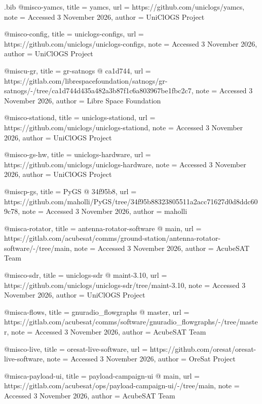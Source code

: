 \begin{filecontents*}[overwrite]{\jobname.bib}
@misc{o-yamcs,
  title = {{yamcs}},
  url = {https://github.com/uniclogs/yamcs},
  note = {Accessed 3 November 2026},
  author = {{UniClOGS Project}}
}

@misc{o-config,
  title = {{uniclogs-\allowbreak{}configs}},
  url = {https://github.com/uniclogs/uniclogs-configs},
  note = {Accessed 3 November 2026},
  author = {{UniClOGS Project}}
}

@misc{u-gr,
  title = {{gr-\allowbreak{}satnogs @ ca1d744}},
  url = {https://gitlab.com/librespacefoundation/satnogs/gr-satnogs/-/tree/ca1d744d435a482a3b87f1c6a803967be1fbc2c7},
  note = {Accessed 3 November 2026},
  author = {{Libre Space Foundation}}
}

@misc{o-stationd,
  title = {{uniclogs-\allowbreak{}stationd}},
  url = {https://github.com/uniclogs/uniclogs-stationd},
  note = {Accessed 3 November 2026},
  author = {{UniClOGS Project}}
}

@misc{o-gs-hw,
  title = {{uniclogs-\allowbreak{}hardware}},
  url = {https://github.com/uniclogs/uniclogs-hardware},
  note = {Accessed 3 November 2026},
  author = {{UniClOGS Project}}
}

@misc{p-gs,
  title = {{PyGS @ 34f95b8}},
  url = {https://github.com/maholli/PyGS/tree/34f95b88323805511a2acc71627d0d8ddc609c78},
  note = {Accessed 3 November 2026},
  author = {{maholli}}
}

@misc{a-rotator,
  title = {{antenna-\allowbreak{}rotator-\allowbreak{}software @ main}},
  url = {https://gitlab.com/acubesat/comms/ground-station/antenna-rotator-software/-/tree/main},
  note = {Accessed 3 November 2026},
  author = {{AcubeSAT Team}}
}

@misc{o-sdr,
  title = {{uniclogs-\allowbreak{}sdr @ maint-\allowbreak{}3.10}},
  url = {https://github.com/uniclogs/uniclogs-sdr/tree/maint-3.10},
  note = {Accessed 3 November 2026},
  author = {{UniClOGS Project}}
}

@misc{a-flows,
  title = {{gnuradio\_\allowbreak{}flowgraphs @ master}},
  url = {https://gitlab.com/acubesat/comms/software/gnuradio_flowgraphs/-/tree/master},
  note = {Accessed 3 November 2026},
  author = {{AcubeSAT Team}}
}

@misc{o-live,
  title = {{oresat-\allowbreak{}live-\allowbreak{}software}},
  url = {https://github.com/oresat/oresat-live-software},
  note = {Accessed 3 November 2026},
  author = {{OreSat Project}}
}

@misc{a-payload-ui,
  title = {{payload-\allowbreak{}campaign-\allowbreak{}ui @ main}},
  url = {https://gitlab.com/acubesat/ops/payload-campaign-ui/-/tree/main},
  note = {Accessed 3 November 2026},
  author = {{AcubeSAT Team}}
}


\end{filecontents*}
